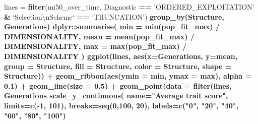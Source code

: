 \documentclass[]{book}
\newenvironment{Shaded}{\begin{snugshade}}{\end{snugshade}}
\newcommand{\CharTok}[1]{\textcolor[rgb]{0.31,0.60,0.02}{#1}}
\newcommand{\DataTypeTok}[1]{\textcolor[rgb]{0.13,0.29,0.53}{#1}}
\newcommand{\DecValTok}[1]{\textcolor[rgb]{0.00,0.00,0.81}{#1}}
\newcommand{\FloatTok}[1]{\textcolor[rgb]{0.00,0.00,0.81}{#1}}
\newcommand{\KeywordTok}[1]{\textcolor[rgb]{0.13,0.29,0.53}{\textbf{#1}}}
\newcommand{\NormalTok}[1]{#1}
\newcommand{\OperatorTok}[1]{\textcolor[rgb]{0.81,0.36,0.00}{\textbf{#1}}}
\newcommand{\StringTok}[1]{\textcolor[rgb]{0.31,0.60,0.02}{#1}}
\begin{document}
\begin{Shaded}
\begin{Highlighting}[]
\NormalTok{lines =}\StringTok{ }\KeywordTok{filter}\NormalTok{(mi50_over_time, Diagnostic }\OperatorTok{==}\StringTok{ 'ORDERED_EXPLOITATION'} \OperatorTok{&}\StringTok{ `}\DataTypeTok{Selection}\CharTok{\textbackslash{}n}\DataTypeTok{Scheme}\StringTok{`} \OperatorTok{==}\StringTok{ 'TRUNCATION'}\NormalTok{) }\OperatorTok{%>%}
\StringTok{  }\KeywordTok{group_by}\NormalTok{(Structure, Generations) }\OperatorTok{%>%}
\StringTok{  }\NormalTok{dplyr}\OperatorTok{::}\KeywordTok{summarise}\NormalTok{(}
    \DataTypeTok{min =} \KeywordTok{min}\NormalTok{(pop_fit_max) }\OperatorTok{/}\StringTok{ }\NormalTok{DIMENSIONALITY,}
    \DataTypeTok{mean =} \KeywordTok{mean}\NormalTok{(pop_fit_max) }\OperatorTok{/}\StringTok{ }\NormalTok{DIMENSIONALITY,}
    \DataTypeTok{max =} \KeywordTok{max}\NormalTok{(pop_fit_max) }\OperatorTok{/}\StringTok{ }\NormalTok{DIMENSIONALITY}
\NormalTok{  )}
\KeywordTok{ggplot}\NormalTok{(lines, }\KeywordTok{aes}\NormalTok{(}\DataTypeTok{x=}\NormalTok{Generations, }\DataTypeTok{y=}\NormalTok{mean, }\DataTypeTok{group =}\NormalTok{ Structure, }\DataTypeTok{fill =}\NormalTok{ Structure, }\DataTypeTok{color =}\NormalTok{ Structure, }\DataTypeTok{shape =}\NormalTok{ Structure)) }\OperatorTok{+}
\StringTok{  }\KeywordTok{geom_ribbon}\NormalTok{(}\KeywordTok{aes}\NormalTok{(}\DataTypeTok{ymin =}\NormalTok{ min, }\DataTypeTok{ymax =}\NormalTok{ max), }\DataTypeTok{alpha =} \FloatTok{0.1}\NormalTok{) }\OperatorTok{+}
\StringTok{  }\KeywordTok{geom_line}\NormalTok{(}\DataTypeTok{size =} \FloatTok{0.5}\NormalTok{) }\OperatorTok{+}
\StringTok{  }\KeywordTok{geom_point}\NormalTok{(}\DataTypeTok{data =} \KeywordTok{filter}\NormalTok{(lines, Generations }\OperatorTok{%%}\StringTok{ }\DecValTok{2000} \OperatorTok{==}\StringTok{ }\DecValTok{0}\NormalTok{), }\DataTypeTok{size =} \FloatTok{2.5}\NormalTok{, }\DataTypeTok{stroke =} \FloatTok{2.0}\NormalTok{, }\DataTypeTok{alpha =} \FloatTok{1.0}\NormalTok{) }\OperatorTok{+}
\StringTok{  }\KeywordTok{scale_y_continuous}\NormalTok{(}
    \DataTypeTok{name=}\StringTok{"Average trait score"}\NormalTok{,}
    \DataTypeTok{limits=}\KeywordTok{c}\NormalTok{(}\OperatorTok{-}\DecValTok{1}\NormalTok{, }\DecValTok{101}\NormalTok{),}
    \DataTypeTok{breaks=}\KeywordTok{seq}\NormalTok{(}\DecValTok{0}\NormalTok{,}\DecValTok{100}\NormalTok{, }\DecValTok{20}\NormalTok{),}
    \DataTypeTok{labels=}\KeywordTok{c}\NormalTok{(}\StringTok{"0"}\NormalTok{, }\StringTok{"20"}\NormalTok{, }\StringTok{"40"}\NormalTok{, }\StringTok{"60"}\NormalTok{, }\StringTok{"80"}\NormalTok{, }\StringTok{"100"}\NormalTok{)}
}}}
\end{Highlighting}
\end{Shaded}
\end{document}

